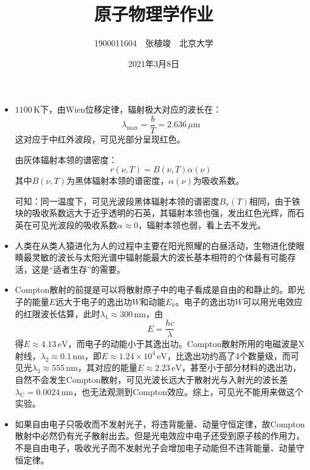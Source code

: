\documentclass[a4paper,fontset=none]{ctexart}
\begin{document}
    \title{\textbf{原子物理学作业}}
    \author{1900011604\ \ 张植竣\ \ 北京大学}
    \date{2021年3月8日}

    \maketitle

    \begin{itemize}

        \subsection*{思考题}

        \item[1.1]
        $1100\,\mathrm{K}$下，由Wien位移定律，辐射极大对应的波长在：
        \[
        \lambda_{\mathrm{max}} = \frac{b}{T} = 2.636\,\mu\mathrm{m}
        \]
        这对应于中红外波段，可见光部分呈现红色。

        由灰体辐射本领的谱密度：
        \[
        r(\nu,T) = B(\nu,T)\alpha(\nu)
        \]
        其中$B(\nu,T)$为黑体辐射本领的谱密度，$\alpha(\nu)$为吸收系数。

        可知：同一温度下，可见光波段黑体辐射本领的谱密度$B_\mathrm{v}(T)$相同，由于铁块的吸收系数远大于近乎透明的石英，其辐射本领也强，发出红色光辉，而石英在可见光波段的吸收系数$\alpha \approx 0$，辐射本领也弱，看上去不发光。

        \item[1.5]
        人类在从类人猿进化为人的过程中主要在阳光照耀的白昼活动，生物进化使眼睛最灵敏的波长与太阳光谱中辐射能最大的波长基本相符的个体最有可能存活，这是“适者生存”的需要。

        \item[1.10]
        Compton散射的前提是可以将散射原子中的电子看成是自由的和静止的。即光子的能量$E$远大于电子的逸出功$W$和动能$E_k$。电子的逸出功$W$可以用光电效应的红限波长估算，此时$\lambda_1 \approx 300\,\mathrm{nm}$，由
        \[
        E = \frac{hc}{\lambda}
        \]
        得$E \approx 4.13\,\mathrm{eV}$，而电子的动能小于其逸出功。Compton散射所用的电磁波是X射线，$\lambda_2 \approx 0.1\,\mathrm{nm}$，即$E \approx 1.24\times10^4\,\mathrm{eV}$，比逸出功约高了4个数量级，而可见光$\lambda_3 \approx 555\,\mathrm{nm}$，其对应的能量$E \approx 2.23\,\mathrm{eV}$，甚至小于部分材料的逸出功，自然不会发生Compton散射，可见光波长远大于散射光与入射光的波长差$\lambda_\mathrm{C} = 0.0024\,\mathrm{nm}$，也无法观测到Compton效应。综上，可见光不能用来做这个实验。

        \item[1.11]
        如果自由电子只吸收而不发射光子，将违背能量、动量守恒定律，故Compton散射中必然仍有光子散射出去。但是光电效应中电子还受到原子核的作用力，不是自由电子，吸收光子而不发射光子会增加电子动能但不违背能量、动量守恒定律。


\end{itemize}
\end{document}
